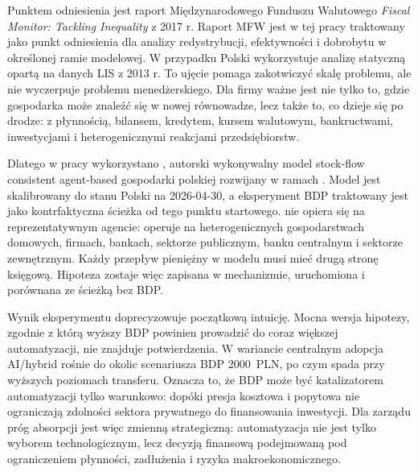 Punktem odniesienia jest raport Międzynarodowego Funduszu Walutowego \textit{Fiscal Monitor: Tackling Inequality} z 2017 r. Raport MFW jest w tej pracy traktowany jako punkt odniesienia dla analizy redystrybucji, efektywności i dobrobytu w określonej ramie modelowej. W przypadku Polski wykorzystuje analizę statyczną opartą na danych LIS z 2013 r. To ujęcie pomaga zakotwiczyć skalę problemu, ale nie wyczerpuje problemu menedżerskiego. Dla firmy ważne jest nie tylko to, gdzie gospodarka może znaleźć się w nowej równowadze, lecz także to, co dzieje się po drodze: z płynnością, bilansem, kredytem, kursem walutowym, bankructwami, inwestycjami i heterogenicznymi reakcjami przedsiębiorstw.

Dlatego w pracy wykorzystano \amor{}, autorski wykonywalny model stock-flow consistent agent-based gospodarki polskiej rozwijany w ramach \bbg{}. Model jest skalibrowany do stanu Polski na 2026-04-30, a eksperyment BDP traktowany jest jako kontrfaktyczna ścieżka od tego punktu startowego. \amor{} nie opiera się na reprezentatywnym agencie: operuje na heterogenicznych gospodarstwach domowych, firmach, bankach, sektorze publicznym, banku centralnym i sektorze zewnętrznym. Każdy przepływ pieniężny w modelu musi mieć drugą stronę księgową. Hipoteza zostaje więc zapisana w mechanizmie, uruchomiona i porównana ze ścieżką bez BDP.

Wynik eksperymentu doprecyzowuje początkową intuicję. Mocna wersja hipotezy, zgodnie z którą wyższy BDP powinien prowadzić do coraz większej automatyzacji, nie znajduje potwierdzenia. W wariancie centralnym adopcja AI/hybrid rośnie do okolic scenariusza BDP 2000~PLN, po czym spada przy wyższych poziomach transferu. Oznacza to, że BDP może być katalizatorem automatyzacji tylko warunkowo: dopóki presja kosztowa i popytowa nie ograniczają zdolności sektora prywatnego do finansowania inwestycji. Dla zarządu próg absorpcji jest więc zmienną strategiczną: automatyzacja nie jest tylko wyborem technologicznym, lecz decyzją finansową podejmowaną pod ograniczeniem płynności, zadłużenia i ryzyka makroekonomicznego.
